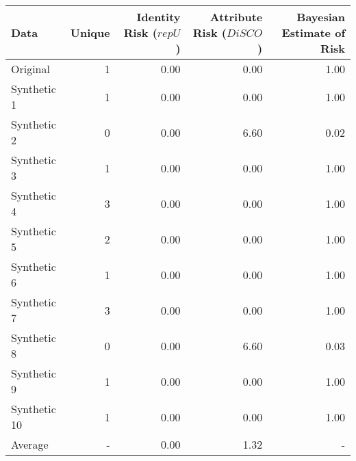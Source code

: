 \begin{tabular}{lrrrr}
  \toprule
Data & Unique & Identity Risk ($repU$) & Attribute Risk ($DiSCO$) & Bayesian Estimate of Risk \\ 
  \midrule
Original & 1& 0.00 & 0.00 & 1.00 \\ 
  Synthetic 1 &1& 0.00 & 0.00 & 1.00 \\ 
  Synthetic 2 &0& 0.00 & 6.60 & 0.02 \\ 
  Synthetic 3 &1& 0.00 & 0.00 & 1.00 \\ 
  Synthetic 4 &3& 0.00 & 0.00 & 1.00 \\ 
  Synthetic 5 &2& 0.00 & 0.00 & 1.00 \\ 
  Synthetic 6 &1& 0.00 & 0.00 & 1.00 \\ 
  Synthetic 7 &3& 0.00 & 0.00 & 1.00 \\ 
  Synthetic 8 &0& 0.00 & 6.60 & 0.03\\ 
  Synthetic 9 &1& 0.00 & 0.00 & 1.00 \\ 
  Synthetic 10 &1& 0.00 & 0.00 & 1.00 \\ 
  Average & - &  0.00 & 1.32 & - \\ 
   \bottomrule
\end{tabular}
